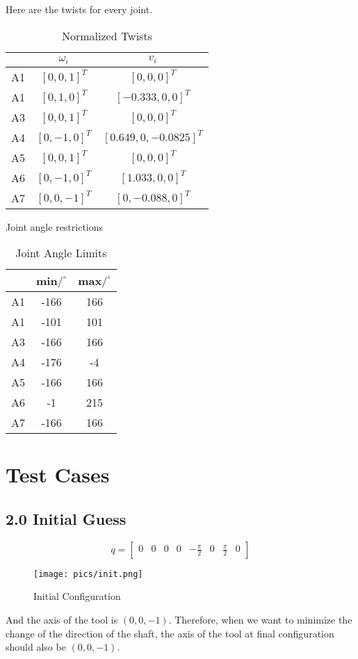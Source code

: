 \documentclass[english,10pt,a4paper]{book}
\begin{document}
		Here are the twists for every joint.
		\begin{table}[H]
			\centering
			\caption{Normalized Twists}
			\begin{tabular}{|c|c|c|}
				\hline
				& $\omega_i$ & $v_i$ \\
				\hline
				A1 & $[0, 0, 1]^{T}$ & $[0, 0, 0]^{T}$ \\
				\hline
				A1 & $[0, 1, 0]^{T}$ & $[-0.333, 0, 0]^{T}$ \\
				\hline
				A3 & $[0, 0, 1]^{T}$ & $[0, 0, 0]^{T}$ \\
				\hline
				A4 & $[0, -1, 0]^{T}$ & $[0.649, 0, -0.0825]^{T}$ \\
				\hline
				A5 & $[0, 0, 1]^{T}$ & $[0, 0, 0]^{T}$ \\
				\hline
				A6 & $[0, -1, 0]^{T}$ & $[1.033, 0, 0]^{T}$ \\
				\hline
				A7 & $[0, 0, -1]^{T}$ & $[0, -0.088, 0]^{T}$ \\
				\hline
			\end{tabular}
		\end{table}
		Joint angle restrictions
		\begin{table}[H]
			\centering
			\caption{Joint Angle Limits}
			\begin{tabular}{|c|c|c|}
				\hline
				& min$/^\circ$& max$/^\circ$ \\
				\hline
				A1 & -166 & 166 \\
				\hline
				A1 & -101 & 101 \\
				\hline
				A3 & -166 & 166 \\
				\hline
				A4 & -176 & -4 \\
				\hline
				A5 & -166 & 166 \\
				\hline
				A6 & -1 & 215 \\
				\hline
				A7 & -166 & 166 \\
				\hline
			\end{tabular}
		\end{table}
		\section{Test Cases}
		\subsection*{2.0   Initial Guess}
		\begin{equation}
			q = \begin{bmatrix}
				0 & 0 & 0 & 0 & -\frac{\pi}{2} & 0 & \frac{\pi}{2} & 0
			\end{bmatrix}
		\end{equation}
		\begin{figure}[H]
			\texttt{[image: pics/init.png]}
			\caption{Initial Configuration}
		\end{figure}
		And the axis of the tool is \((0, 0, -1)\). Therefore, when we want to minimize the change of the direction of the shaft, the axis of the tool at final configuration should also be \((0, 0, -1)\).
\end{document}
